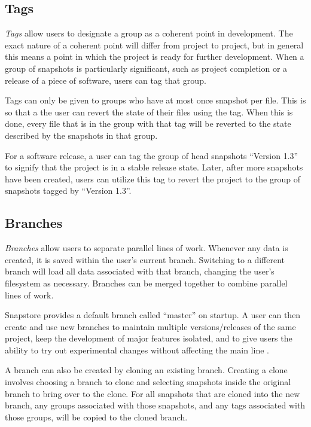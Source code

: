 \subsection{Tags}

\textit{Tags} allow users to designate a group as a coherent point in development. The exact nature of a coherent point will differ from project to project, but in general this means a point in which the project is ready for further development. When a group of snapshots is particularly significant, such as project completion or a release of a piece of software, users can tag that group.

Tags can only be given to groups who have at most once snapshot per file. This is so that a the user can revert the state of their files using the tag. When this is done, every file that is in the group with that tag will be reverted to the state described by the snapshots in that group.

For a software release, a user can tag the group of head snapshots ``Version 1.3'' to signify that the project is in a stable release state. Later, after more snapshots have been created, users can utilize this tag to revert the project to the group of snapshots tagged by ``Version 1.3''.

\subsection{Branches}

\textit{Branches} allow users to separate parallel lines of work. Whenever any data is created, it is saved within the user's current branch. Switching to a different branch will load all data associated with that branch, changing the user's filesystem as necessary. Branches can be merged together to combine parallel lines of work.

Snapstore provides a default branch called ``master'' on startup. A user can then create and use new branches to maintain multiple versions/releases of the same project, keep the development of major features isolated, and to give users the ability to try out experimental changes without affecting the main line \cite{RossoJackson}.

A branch can also be created by cloning an existing branch. Creating a clone involves choosing a branch to clone and selecting snapshots inside the original branch to bring over to the clone. For all snapshots that are cloned into the new branch, any groups associated with those snapshots, and any tags associated with those groups, will be copied to the cloned branch.

